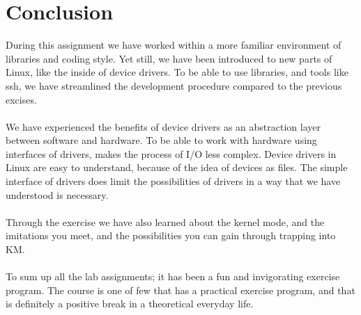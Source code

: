 \section{Conclusion}
During this assignment we have worked within a more familiar environment of  libraries and coding style. Yet still, we have been introduced to new parts of Linux, like the inside of device drivers. To be able to use libraries, and tools like ssh, we have streamlined the development procedure compared to the previous excises.\\
\\
We have experienced the benefits of device drivers as an abstraction layer between software and hardware. To be able to work with hardware using interfaces of drivers, makes the process of I/O less complex. Device drivers in Linux are easy to understand, because of the idea of devices as files. The simple interface of drivers does limit the possibilities of drivers in a way that we have understood is necessary.\\
\\
Through the exercise we have also learned about the kernel mode, and the imitations you meet, and the possibilities you can gain through trapping into KM.\\
\\
To sum up all the lab assignments; it has been a fun and invigorating exercise program. The course is one of few that has a practical exercise program, and that is definitely a positive break in a theoretical everyday life.
